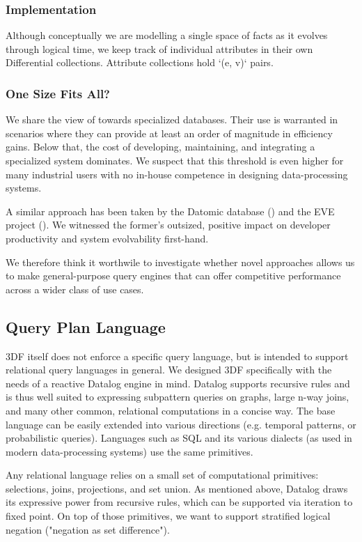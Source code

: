 \documentclass[../index.tex]{subfiles}
\begin{document}
\subsubsection{Implementation}

Although conceptually we are modelling a single space of facts as it
evolves through logical time, we keep track of individual attributes
in their own Differential collections. Attribute collections hold `(e,
v)` pairs.

\subsubsection{One Size Fits All?}

We share the view of \cite{aref2015design} towards specialized
databases. Their use is warranted in scenarios where they can provide
at least an order of magnitude in efficiency gains. Below that, the
cost of developing, maintaining, and integrating a specialized system
dominates. We suspect that this threshold is even higher for many
industrial users with no in-house competence in designing
data-processing systems.

A similar approach has been taken by the Datomic database
(\cite{datomic}) and the EVE project (\cite{eve}). We witnessed the
former's outsized, positive impact on developer productivity and
system evolvability first-hand.

We therefore think it worthwile to investigate whether novel
approaches allows us to make general-purpose query engines that can
offer competitive performance across a wider class of use cases.

\subsection{Query Plan Language}

3DF itself does not enforce a specific query language, but is intended
to support relational query languages in general. We designed 3DF
specifically with the needs of a reactive Datalog engine in
mind. Datalog supports recursive rules and is thus well suited to
expressing subpattern queries on graphs, large n-way joins, and many
other common, relational computations in a concise way. The base
language can be easily extended into various directions (e.g. temporal
patterns, or probabilistic queries). Languages such as SQL and its
various dialects (as used in modern data-processing systems) use the
same primitives.

Any relational language relies on a small set of computational
primitives: selections, joins, projections, and set union. As
mentioned above, Datalog draws its expressive power from recursive
rules, which can be supported via iteration to fixed point. On top of
those primitives, we want to support stratified logical negation
("negation as set difference").
\end{document}
